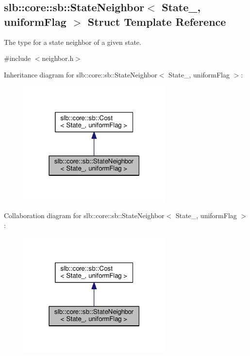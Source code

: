 \hypertarget{structslb_1_1core_1_1sb_1_1StateNeighbor}{}\subsection{slb\+:\+:core\+:\+:sb\+:\+:State\+Neighbor$<$ State\+\_\+, uniform\+Flag $>$ Struct Template Reference}
\label{structslb_1_1core_1_1sb_1_1StateNeighbor}


The type for a state neighbor of a given state.  




{\ttfamily \#include $<$neighbor.\+h$>$}



Inheritance diagram for slb\+:\+:core\+:\+:sb\+:\+:State\+Neighbor$<$ State\+\_\+, uniform\+Flag $>$\+:\nopagebreak
\begin{figure}[H]
\begin{center}
\leavevmode
\includegraphics[width=219pt]{structslb_1_1core_1_1sb_1_1StateNeighbor__inherit__graph}
\end{center}
\end{figure}


Collaboration diagram for slb\+:\+:core\+:\+:sb\+:\+:State\+Neighbor$<$ State\+\_\+, uniform\+Flag $>$\+:\nopagebreak
\begin{figure}[H]
\begin{center}
\leavevmode
\includegraphics[width=219pt]{structslb_1_1core_1_1sb_1_1StateNeighbor__coll__graph}
\end{center}
\end{figure}
